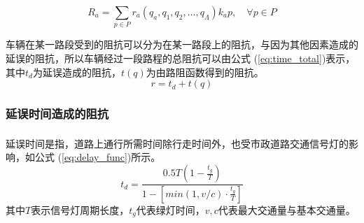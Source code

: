 \documentclass[fontset=windows,a4paper,12pt]{ctexart}
\newcommand{\upcite}[1]{\textsuperscript{\textsuperscript{\cite{#1}}}}
\renewcommand{\eqref}[1]{公式 (\ref{#1})}
\begin{document}
		\begin{equation}
			R_a=\sum\limits_{p\in P}r_a(q_a,q_1,q_2,\dots,q_\Lambda)k_ap,\quad\forall p \in P
			\label{eq:res_for_p}
		\end{equation}
		
		车辆在某一路段受到的阻抗可以分为在某一路段上的阻抗，与因为其他因素造成的延误的阻抗，所以车辆经过一段路程的总阻抗可以由\eqref{eq:time_total}表示，其中$ t_d $为延误造成的阻抗，$t(q)$为由路阻函数得到的阻抗。
		\begin{equation}
			r = t_d + t(q)
			\label{eq:time_total}
		\end{equation}		
		
		\subsubsection{延误时间造成的阻抗}
			延误时间\upcite{任福田2003交通工程学}是指，道路上通行所需时间除行走时间外，也受市政道路交通信号灯的影响，如\eqref{eq:delay_func}所示。
			\begin{equation}
				t_d=\frac{0.5T(1-\frac{t_g}{T})}{1-[min(1,v/c)\cdot{\frac{t_g}{T}}]}
				\label{eq:delay_func}
			\end{equation}
			其中$ T $表示信号灯周期长度，$ t_g $代表绿灯时间，$ v,c $代表最大交通量与基本交通量。
			
\end{document}
